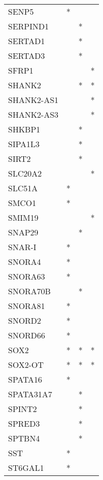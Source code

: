 \begin{longtable}{lccc}
SENP5            &     * &    &         \\
SERPIND1         &       &  * &         \\
SERTAD1          &       &  * &         \\
SERTAD3          &       &  * &         \\
SFRP1            &       &    &       * \\
SHANK2           &       &  * &       * \\
SHANK2-AS1       &       &    &       * \\
SHANK2-AS3       &       &    &       * \\
SHKBP1           &       &  * &         \\
SIPA1L3          &       &  * &         \\
SIRT2            &       &  * &         \\
SLC20A2          &       &    &       * \\
SLC51A           &     * &    &         \\
SMCO1            &     * &    &         \\
SMIM19           &       &    &       * \\
SNAP29           &       &  * &         \\
SNAR-I           &     * &    &         \\
SNORA4           &     * &    &         \\
SNORA63          &     * &    &         \\
SNORA70B         &       &  * &         \\
SNORA81          &     * &    &         \\
SNORD2           &     * &    &         \\
SNORD66          &     * &    &         \\
SOX2             &     * &  * &       * \\
SOX2-OT          &     * &  * &       * \\
SPATA16          &     * &    &         \\
SPATA31A7        &       &  * &         \\
SPINT2           &       &  * &         \\
SPRED3           &       &  * &         \\
SPTBN4           &       &  * &         \\
SST              &     * &    &         \\
ST6GAL1          &     * &    &         \\

\end{longtable}
